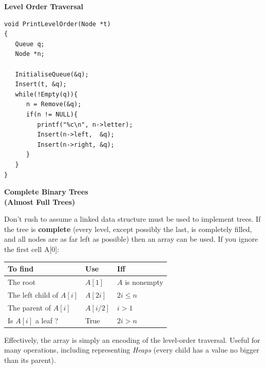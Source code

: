 \documentclass[a4,portraitt]{slides}
\begin{document}
\newpage
{\samepage
\begin{center}
{\Large{\bf Level Order Traversal}}
\end{center}
\begin{verbatim}
void PrintLevelOrder(Node *t)
{
   Queue q;
   Node *n;

   InitialiseQueue(&q);
   Insert(t, &q);
   while(!Empty(q)){
      n = Remove(&q);
      if(n != NULL){
         printf("%c\n", n->letter);
         Insert(n->left,  &q);
         Insert(n->right, &q);
      }
   }
}
\end{verbatim}
}

\newpage
{\samepage
\begin{center}
{\Large{\bf Complete Binary Trees\\[1.75ex]{\small(Almost Full Trees)}}}
\end{center}
Don't rush to assume a linked data structure must be used to implement
trees. If the tree is {\bf complete} (every level, except possibly the last, is completely filled, and all nodes are as far left as possible)
then an array can be used. If you ignore the first cell A[0]:

\begin{center}
\begin{tabular}{|l|l|l|}\hline
To find & Use & Iff\\ \hline
The root & $A[1]$ & $A$ is nonempty \\
The left child of $A[i]$ & $A[2i]$ & $2i \leq n$ \\
The parent of $A[i]$ & $A[i/2]$ & $i > 1$\\
Is $A[i]$ a leaf ? & True & $2i > n$\\ \hline
\end{tabular}
\end{center}

Effectively, the array is simply an encoding of the level-order traversal.
Useful for many operations, including representing {\it Heaps} (every child has a value no bigger than its parent).
}
\end{document}
